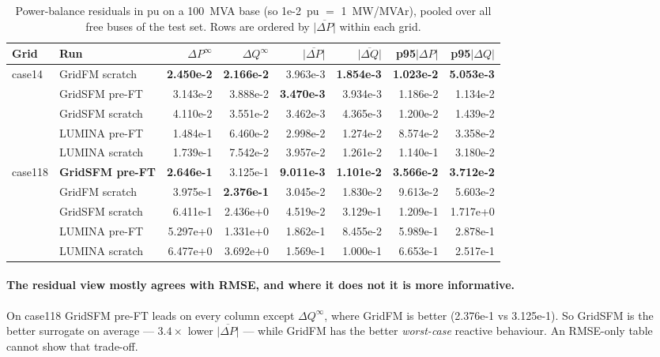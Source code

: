 \documentclass[10pt]{article}
\begin{document}
\begin{table}[H]
\centering
\small
\begin{tabular}{llrrrrrr}
\toprule
Grid & Run & \(\Delta P^{\infty}\) & \(\Delta Q^{\infty}\) & \(\overline{|\Delta P|}\) & \(\overline{|\Delta Q|}\) & p95\(|\Delta P|\) & p95\(|\Delta Q|\) \\
\midrule
case14 & GridFM scratch  & \textbf{2.450e-2} & \textbf{2.166e-2} & 3.963e-3 & \textbf{1.854e-3} & \textbf{1.023e-2} & \textbf{5.053e-3} \\
       & GridSFM pre-FT  & 3.143e-2 & 3.888e-2 & \textbf{3.470e-3} & 3.934e-3 & 1.186e-2 & 1.134e-2 \\
       & GridSFM scratch & 4.110e-2 & 3.551e-2 & 3.462e-3 & 4.365e-3 & 1.200e-2 & 1.439e-2 \\
       & LUMINA pre-FT   & 1.484e-1 & 6.460e-2 & 2.998e-2 & 1.274e-2 & 8.574e-2 & 3.358e-2 \\
       & LUMINA scratch  & 1.739e-1 & 7.542e-2 & 3.957e-2 & 1.261e-2 & 1.140e-1 & 3.180e-2 \\
\midrule
case118 & \textbf{GridSFM pre-FT} & \textbf{2.646e-1} & 3.125e-1 & \textbf{9.011e-3} & \textbf{1.101e-2} & \textbf{3.566e-2} & \textbf{3.712e-2} \\
        & GridFM scratch  & 3.975e-1 & \textbf{2.376e-1} & 3.045e-2 & 1.830e-2 & 9.613e-2 & 5.603e-2 \\
        & GridSFM scratch & 6.411e-1 & 2.436e+0 & 4.519e-2 & 3.129e-1 & 1.209e-1 & 1.717e+0 \\
        & LUMINA pre-FT   & 5.297e+0 & 1.331e+0 & 1.862e-1 & 8.455e-2 & 5.989e-1 & 2.878e-1 \\
        & LUMINA scratch  & 6.477e+0 & 3.692e+0 & 1.569e-1 & 1.000e-1 & 6.653e-1 & 2.517e-1 \\
\bottomrule
\end{tabular}
\caption{Power-balance residuals in pu on a 100~MVA base (so 1e-2~pu \(=\)
1~MW/MVAr), pooled over all free buses of the test set. Rows are ordered by
\(\overline{|\Delta P|}\) within each grid.}
\end{table}

\paragraph{The residual view mostly agrees with RMSE, and where it does not it
is more informative.} On case118 GridSFM pre-FT leads on every column except
\(\Delta Q^{\infty}\), where GridFM is better (2.376e-1 vs 3.125e-1). So GridSFM
is the better surrogate on average --- \(3.4\times\) lower
\(\overline{|\Delta P|}\) --- while GridFM has the better \emph{worst-case}
reactive behaviour. An RMSE-only table cannot show that trade-off.
\end{document}
